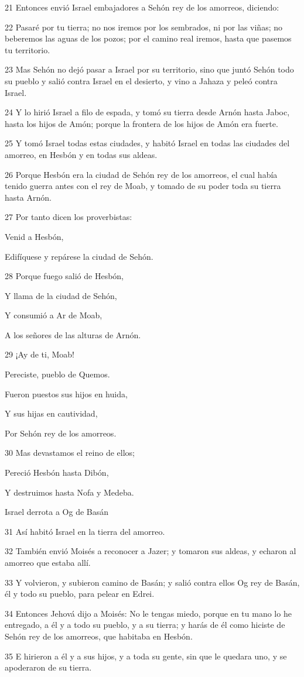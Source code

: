 \par 21 Entonces envió Israel embajadores a Sehón rey de los amorreos, diciendo:
\par 22 Pasaré por tu tierra; no nos iremos por los sembrados, ni por las viñas; no beberemos las aguas de los pozos; por el camino real iremos, hasta que pasemos tu territorio.
\par 23 Mas Sehón no dejó pasar a Israel por su territorio, sino que juntó Sehón todo su pueblo y salió contra Israel en el desierto, y vino a Jahaza y peleó contra Israel.
\par 24 Y lo hirió Israel a filo de espada, y tomó su tierra desde Arnón hasta Jaboc, hasta los hijos de Amón; porque la frontera de los hijos de Amón era fuerte.
\par 25 Y tomó Israel todas estas ciudades, y habitó Israel en todas las ciudades del amorreo, en Hesbón y en todas sus aldeas.
\par 26 Porque Hesbón era la ciudad de Sehón rey de los amorreos, el cual había tenido guerra antes con el rey de Moab, y tomado de su poder toda su tierra hasta Arnón.
\par 27 Por tanto dicen los proverbistas:
\par Venid a Hesbón,
\par Edifíquese y repárese la ciudad de Sehón. 
\par 28 Porque fuego salió de Hesbón,
\par Y llama de la ciudad de Sehón,
\par Y consumió a Ar de Moab,
\par A los señores de las alturas de Arnón.
\par 29 ¡Ay de ti, Moab!
\par Pereciste, pueblo de Quemos.
\par Fueron puestos sus hijos en huida,
\par Y sus hijas en cautividad,
\par Por Sehón rey de los amorreos.
\par 30 Mas devastamos el reino de ellos;
\par Pereció Hesbón hasta Dibón,
\par Y destruimos hasta Nofa y Medeba.
\par Israel derrota a Og de Basán 
\par 31 Así habitó Israel en la tierra del amorreo.
\par 32 También envió Moisés a reconocer a Jazer; y tomaron sus aldeas, y echaron al amorreo que estaba allí.
\par 33 Y volvieron, y subieron camino de Basán; y salió contra ellos Og rey de Basán, él y todo su pueblo, para pelear en Edrei.
\par 34 Entonces Jehová dijo a Moisés: No le tengas miedo, porque en tu mano lo he entregado, a él y a todo su pueblo, y a su tierra; y harás de él como hiciste de Sehón rey de los amorreos, que habitaba en Hesbón.
\par 35 E hirieron a él y a sus hijos, y a toda su gente, sin que le quedara uno, y se apoderaron de su tierra.

